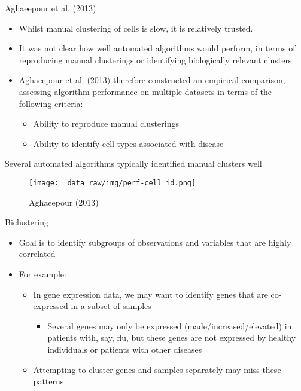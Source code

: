 \documentclass[
  ignorenonframetext,
  aspectratio=169,
]{beamer}
\providecommand{\tightlist}{%
  \setlength{\itemsep}{0pt}\setlength{\parskip}{0pt}}\usepackage{longtable,booktabs,array}
\begin{document}
\begin{frame}{Aghaeepour et al. (2013)}
\protect\hypertarget{aghaeepour_etal13}{}
\begin{itemize}
\tightlist
\item
  Whilst manual clustering of cells is slow, it is relatively trusted.
\item
  It was not clear how well automated algorithms would perform, in terms
  of reproducing manual clusterings or identifying biologically relevant
  clusters.
\item
  Aghaeepour et al. (2013) therefore constructed an empirical
  comparison, assessing algorithm performance on multiple datasets in
  terms of the following criteria:

  \begin{itemize}
  \tightlist
  \item
    Ability to reproduce manual clusterings
  \item
    Ability to identify cell types associated with disease
  \end{itemize}
\end{itemize}
\end{frame}

\begin{frame}{Several automated algorithms typically identified manual
clusters well}
\protect\hypertarget{several-automated-algorithms-typically-identified-manual-clusters-well}{}
\begin{figure}[H]
\centering
\texttt{[image: \_data\_raw/img/perf-cell\_id.png]}
\caption{Aghaeepour (2013)}
\end{figure}
\end{frame}

\begin{frame}{Biclustering}
\protect\hypertarget{biclustering}{}
\begin{itemize}
\tightlist
\item
  Goal is to identify subgroups of observations and variables that are
  highly correlated
\item
  For example:

  \begin{itemize}
  \tightlist
  \item
    In gene expression data, we may want to identify genes that are
    co-expressed in a subset of samples

    \begin{itemize}
    \tightlist
    \item
      Several genes may only be expressed (made/increased/elevated) in
      patients with, say, flu, but these genes are not expressed by
      healthy individuals or patients with other diseases
    \end{itemize}
  \item
    Attempting to cluster genes and samples separately may miss these
    patterns
  \end{itemize}
\end{itemize}
\end{frame}
\end{document}
